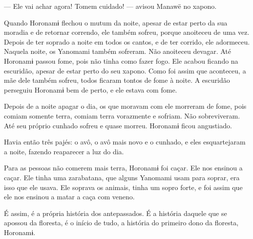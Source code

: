  --- Ele vai achar agora! Tomem cuidado! --- avisou Manawë no xapono. 

Quando Horonamɨ flechou o mutum da noite, apesar de estar perto da sua
moradia e de retornar correndo, ele também sofreu, porque anoiteceu
de uma vez. Depois de ter soprado a noite em todos os cantos, e de ter
corrido, ele adormeceu. Naquela noite, os Yanomami também sofreram. Não
anoiteceu devagar. Até Horonamɨ passou fome, pois não tinha como fazer
fogo. Ele acabou ficando na escuridão, apesar de estar perto do seu
xapono. Como foi assim que aconteceu, a mãe dele também sofreu, todos
ficaram tontos de fome à noite. A escuridão perseguiu Horonamɨ bem de
perto, e ele estava com fome. 

Depois de a noite apagar o dia, os que moravam com ele morreram de
fome, pois comiam somente terra, comiam terra vorazmente e sofriam. Não
sobreviveram. Até seu próprio cunhado sofreu e quase morreu. Horonamɨ
ficou angustiado.

Havia então três pajés: o avô, o avô mais novo e o cunhado, e eles
esquartejaram a noite, fazendo reaparecer a luz do dia. 

Para as pessoas não comerem mais terra, Horonamɨ foi caçar. Ele nos
ensinou a caçar. Ele tinha uma zarabatana, que alguns Yanomami usam para
soprar, era isso que ele usava. Ele soprava os animais, tinha um sopro
forte, e foi assim que ele nos ensinou a matar a caça com veneno. 

 É assim, é a própria história dos antepassados. É a história
daquele que se apossou da floresta, é o início de tudo, a história do
primeiro dono da floresta, Horonamɨ.
